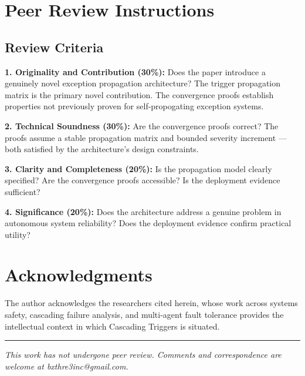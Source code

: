 \documentclass[12pt]{article}
\begin{document}
\section*{Peer Review Instructions}
\label{sec:peer-review}

\subsection*{Review Criteria}

\textbf{1. Originality and Contribution (30\%):} Does the paper introduce a genuinely novel exception propagation architecture? The trigger propagation matrix is the primary novel contribution. The convergence proofs establish properties not previously proven for self-propogating exception systems.

\textbf{2. Technical Soundness (30\%):} Are the convergence proofs correct? The proofs assume a stable propagation matrix and bounded severity increment --- both satisfied by the architecture's design constraints.

\textbf{3. Clarity and Completeness (20\%):} Is the propagation model clearly specified? Are the convergence proofs accessible? Is the deployment evidence sufficient?

\textbf{4. Significance (20\%):} Does the architecture address a genuine problem in autonomous system reliability? Does the deployment evidence confirm practical utility?

\section*{Acknowledgments}

The author acknowledges the researchers cited herein, whose work across systems safety, cascading failure analysis, and multi-agent fault tolerance provides the intellectual context in which Cascading Triggers is situated.




\vspace{2em}
\hrule
\vspace{0.5em}
\noindent\small\textit{This work has not undergone peer review. Comments and correspondence are welcome at bxthre3inc@gmail.com.}
\end{document}
